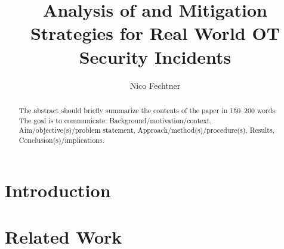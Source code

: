 \documentclass[runningheads]{llncs}
\begin{document}
%
\title{Analysis of and Mitigation Strategies for Real World OT Security Incidents}
%
%
\author{Nico Fechtner}
%
%
%
\maketitle              %
%
\begin{abstract}
The abstract should briefly summarize the contents of the paper in
150--200 words.
The goal is to communicate: Background/motivation/context, Aim/objective(s)/problem statement, Approach/method(s)/procedure(s), Results, Conclusion(s)/implications.

\end{abstract}
%
%
%

\section{Introduction}
\section{Related Work}
\end{document}
